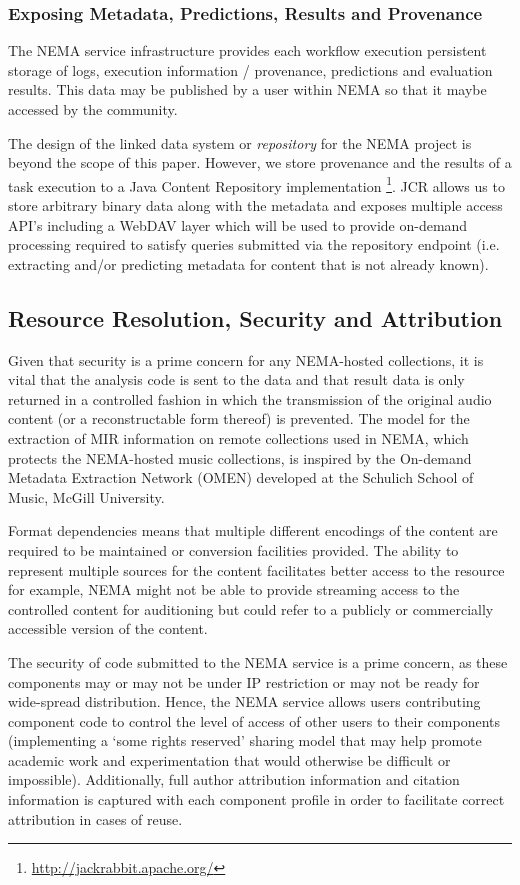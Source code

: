 \documentclass[conference]{IEEEtran}
\begin{document}
\subsubsection{Exposing Metadata, Predictions, Results and Provenance}
The NEMA service infrastructure provides each workflow execution  persistent storage of logs, execution information / provenance, predictions and evaluation results. This data may be published by a user within NEMA so that it maybe accessed by the community.

The design of the linked data system or \emph{repository} for the NEMA project is beyond the scope of this paper. However, we store provenance and the results of a task execution to a Java Content Repository implementation \footnote{\url{http://jackrabbit.apache.org/}}. JCR allows us to store arbitrary binary data along with the metadata and exposes multiple access API's including a WebDAV layer which will be used to provide on-demand processing required to satisfy queries submitted via the repository endpoint (i.e. extracting and/or predicting metadata for content that is not already known).

\subsection{Resource Resolution, Security and Attribution}
Given that security is a prime concern for any NEMA-hosted collections, it is vital that the analysis code is sent to the data and that result data is only returned in a controlled fashion in which the transmission of the original audio content (or a reconstructable form thereof) is prevented.
The model for the extraction of MIR information on remote collections used in NEMA, which protects the NEMA-hosted music collections, is inspired by the On-demand Metadata Extraction Network (OMEN) \cite{mcennis2006overview} developed at the Schulich School of Music, McGill University.

Format dependencies means that multiple different encodings of the content are required to be maintained or conversion facilities provided. The ability to represent multiple sources for the content facilitates better access to the resource for example, NEMA might not be able to provide streaming access to the controlled content for auditioning but could refer to a publicly or commercially accessible version of the content. 

The security of code submitted to the NEMA service is a prime concern, as these components may or may not be under IP restriction or may not be ready for wide-spread distribution. Hence, the NEMA service allows users contributing component code to control the level of access of other users to their components (implementing a `some rights reserved' sharing model that may help promote academic work and experimentation that would otherwise be difficult or impossible).
Additionally, full author attribution information and citation information is captured with each component profile in order to facilitate correct attribution in cases of reuse.
\end{document}
